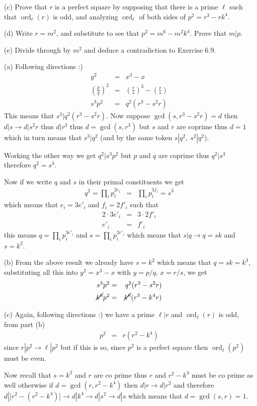 \documentclass[aps,preprint,preprintnumbers,nofootinbib,showpacs,prd]{revtex4-1}
\newcommand{\nbea}{\begin{eqnarray*}}
\newcommand{\neea}{\end{eqnarray*}}
\DeclareMathOperator{\ord}{ord}
\begin{document}
(c) Prove that $r$ is a perfect square by supposing that there is a prime $\ell$ such that $\ord_\ell(r)$ is odd, and analyzing $\ord_\ell$ of both sides of $p^2 = r^3 - rk^4$.

(d) Write $r = m^2$, and substitute to see that $p^2 = m^6 -m^2 k^4$. Prove
that $m | p$.

(e) Divide through by $m^2$ and deduce a contradiction to Exercise 6.9.

(a) Following directions :)
%
\nbea
y^2 & = & x^3 - x \\
\left ( \frac{p}{q} \right )^2 & = & \left ( \frac{r}{s} \right )^3 - \left ( \frac{r}{s} \right ) \\
s^3 p^2 & = & q^2(r^3 - s^2r)
\neea
%
This means that $s^3|q^2(r^3 - s^2r)$. Now suppose $\gcd(s,r^3 - s^2r) = d$ then $d|s \to d |s^2r$ thus $d|r^3$ thus $d = \gcd(s,r^3)$ but $s$ and $r$ are coprime thus $d = 1$ which in turn means that $s^3|q^2$ (and by the same token $s|q^2,~s^2|q^2$).

Working the other way we get $q^2 | s^3 p^2$ but $p$ and $q$ are coprime thus $q^2|s^3$ therefore $q^2 = s^3$.

Now if we write $q$ and $s$ in their primal constituents we get
%
\nbea
q^2 = \prod_i p_i^{2e_i} & = & \prod_i p_i^{3f_i} = s^3
\neea
%
which means that $e_i = 3 e'_i$ and $f_i = 2f'_i$ such that 
%
\nbea
2\cdot 3 e'_i & = & 3\cdot2 f'_i \\
e'_i & = & f'_i
\neea
%
this means $q = \prod_i p_i^{3e'_i}$ and $s = \prod_i p_i^{2e'_i}$ which means that $s|q \to q = sk$ and $s = k^2$.

(b) From the above result we already have $s = k^2$ which means that $q = sk = k^3$, substituting all this into $y^2 = x^3 - x$ with $y = p/q$, $x = r/s$, we get
%
\nbea
s^3 p^2 & = & q^2(r^3 - s^2r) \\
\cancel{k^6} p^2 & = & \cancel{k^6}(r^3 - k^4 r)
\neea
%

(c) Again, following directions :) we have a prime $\ell|r$ and $\ord_\ell(r)$ is odd, from part (b)
%
\nbea
p^2 & = & r(r^2 - k^4)
\neea
%
since $r|p^2 \to \ell | p^2$ but if this is so, since $p^2$ is a perfect square then $\ord_\ell(p^2)$ must be even.

Now recall that $s = k^2$ and $r$ are co prime thus $r$ and $r^2 - k^4$ must be co prime as well otherwise if $d = \gcd(r, r^2 - k^4)$ then $d|r \to d|r^2$ and therefore $d|\lbrack r^2 - (r^2 - k^4) \rbrack \to d | k^4 \to d |s^2 \to d|s$ which means that $d = \gcd(s,r) = 1$.
\end{document}
